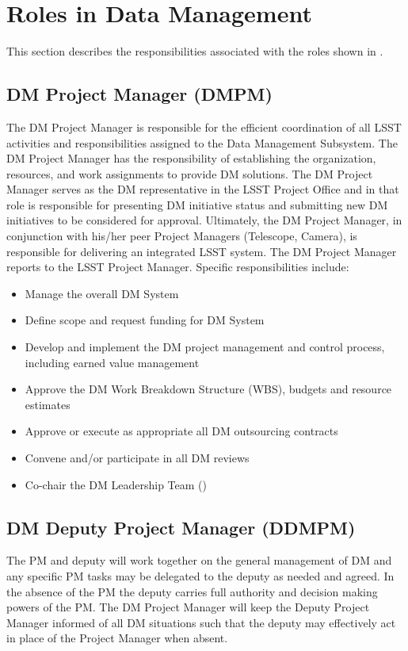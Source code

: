 \section{Roles in Data Management}

This section describes the responsibilities associated with the roles shown in
.


\subsection{DM Project Manager (DMPM)\label{role:dmpm}}

The DM Project Manager is responsible for the efficient coordination of all LSST activities and responsibilities assigned to the Data Management Subsystem. The DM Project Manager has the responsibility of establishing the organization, resources, and work assignments to provide DM solutions.  The DM Project Manager serves as the DM representative in the LSST Project Office and in that role is responsible for presenting DM initiative status and submitting new DM initiatives to be considered for approval. Ultimately, the DM Project Manager, in conjunction with his/her peer Project Managers (Telescope, Camera), is responsible for delivering an integrated LSST system. The DM Project Manager reports to the LSST Project Manager. Specific responsibilities include:

\begin{itemize}
\item Manage the overall DM System
\item Define scope and request funding for DM System
\item Develop and implement the DM project management and control process, including earned value management
\item Approve the DM Work Breakdown Structure (WBS), budgets and resource estimates
\item Approve or execute as appropriate all DM outsourcing contracts
\item Convene and/or participate in all DM reviews
\item Co-chair the DM Leadership Team ()
\end{itemize}

\subsection{DM Deputy Project Manager (DDMPM) \label{role:dmdpm}}
The PM and deputy will work together on the general management of DM and any specific PM tasks may be delegated to the deputy as needed and agreed. In the absence of the PM the deputy carries full authority and decision making powers of the PM. The DM Project Manager will keep the Deputy Project Manager informed of all DM situations such that the deputy may effectively act in place of the Project Manager when absent.


